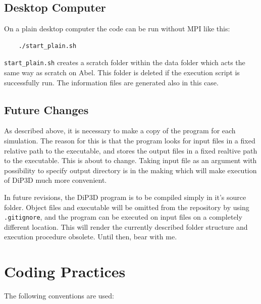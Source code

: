 \documentclass[10pt,a4paper]{article}
\begin{document}
\subsection{Desktop Computer}
On a plain desktop computer the code can be run without MPI like this:

\begin{lstlisting}
	./start_plain.sh
\end{lstlisting}

\lstinline$start_plain.sh$ creates a scratch folder within the data folder which acts the same way as scratch on Abel. This folder is deleted if the execution script is successfully run. The information files are generated also in this case.

\subsection{Future Changes}
As described above, it is necessary to make a copy of the program for each simulation. The reason for this is that the program looks for input files in a fixed relative path to the executable, and stores the output files in a fixed realtive path to the executable. This is about to change. Taking input file as an argument with possibility to specify output directory is in the making which will make execution of DiP3D much more convenient.

In future revisions, the DiP3D program is to be compiled simply in it's source folder. Object files and executable will be omitted from the repository by using \lstinline$.gitignore$, and the program can be executed on input files on a completely different location. This will render the currently described folder structure and execution procedure obsolete. Until then, bear with me.

\section{Coding Practices}
The following conventions are used:
\end{document}
